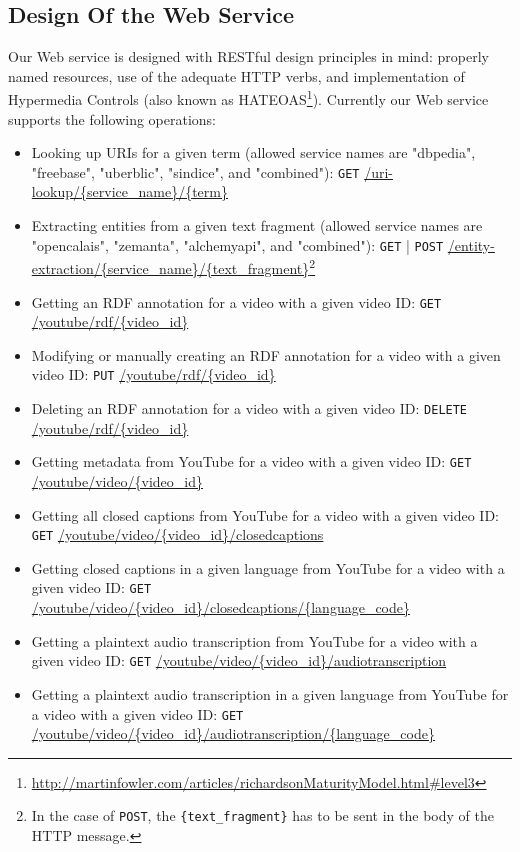 \documentclass{acm_proc_article-sp}
\begin{document}
\subsection{Design Of the Web Service}\label{sec:design}
Our Web service is designed with RESTful design principles in mind: properly named resources, use of the adequate HTTP verbs, and implementation of Hypermedia Controls (also known as HATEOAS\footnote{\url{http://martinfowler.com/articles/richardsonMaturityModel.html#level3}}). Currently our Web service supports the following operations:
\begin{itemize}
\item Looking up URIs for a given term (allowed service names are "dbpedia", "freebase", "uberblic", "sindice", and "combined"): \texttt{GET} \url{/uri-lookup/{service_name}/{term}} 
\item Extracting entities from a given text fragment (allowed service names are "opencalais", "zemanta", "alchemyapi", and "combined"): \texttt{GET} | \texttt{POST} \url{/entity-extraction/{service_name}/{text_fragment}}\footnote{In the case of \texttt{POST}, the \texttt{\{text\_fragment\}} has to be sent in the body of the HTTP message.}
\item Getting an RDF annotation for a video with a given video ID: \texttt{GET} \url{/youtube/rdf/{video_id}}
\item Modifying or manually creating an RDF annotation for a video with a given video ID: \texttt{PUT} \url{/youtube/rdf/{video_id}}
\item Deleting an RDF annotation for a video with a given video ID: \texttt{DELETE} \url{/youtube/rdf/{video_id}}
\item Getting metadata from YouTube for a video with a given video ID: \texttt{GET} \url{/youtube/video/{video_id}}
\item Getting all closed captions from YouTube for a video with a given video ID: \texttt{GET} \url{/youtube/video/{video_id}/closedcaptions}
\item Getting closed captions in a given language from YouTube for a video with a given video ID: \texttt{GET} \url{/youtube/video/{video_id}/closedcaptions/{language_code}}
\item Getting a plaintext audio transcription from YouTube for a video with a given video ID: \texttt{GET} \url{/youtube/video/{video_id}/audiotranscription}
\item Getting a plaintext audio transcription in a given language from YouTube for a video with a given video ID: \texttt{GET} \url{/youtube/video/{video_id}/audiotranscription/{language_code}}
\end{itemize}
\end{document}
